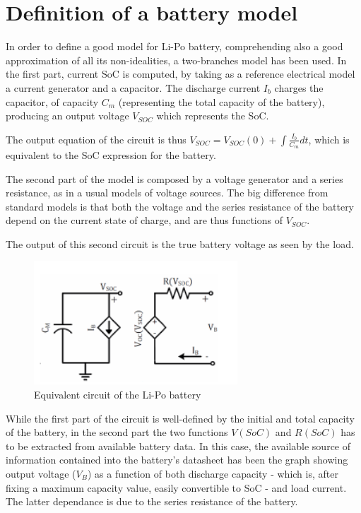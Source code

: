 \section{Definition of a battery model}

In order to define a good model for Li-Po battery, comprehending also a good approximation of all its non-idealities, a two-branches model has been used.
In the first part, current SoC is computed, by taking as a reference electrical model a current generator and a capacitor. The discharge current $I_{b}$ charges the capacitor, of capacity $C_{m}$ (representing the total capacity of the battery), producing an output voltage $V_{SOC}$ which represents the SoC. 


The output equation of the circuit is thus $V_{SOC} = V_{SOC}(0)+\int\!\frac{I_{b}}{C_{m}}dt$, which is equivalent to the SoC expression for the battery.

The second part of the model is composed by a voltage generator and a series resistance, as in a usual models of voltage sources. The big difference from standard models is that both the voltage and the series resistance of the battery depend on the current state of charge, and are thus functions of $V_{SOC}$.

The output of this second circuit is the true battery voltage as seen by the load.

\begin{figure}[h]
  \centering
  \includegraphics[width=3in]{circuit}
  \caption{Equivalent circuit of the Li-Po battery}
\end{figure}

While the first part of the circuit is well-defined by the initial and total capacity of the battery, in the second part the two functions $V(SoC)$ and $R(SoC)$ has to be extracted from available battery data. In this case, the available source of information contained into the battery's datasheet has been the graph showing output voltage ($V_{B}$) as a function of both discharge capacity - which is, after fixing a maximum capacity value, easily convertible to SoC - and load current. The latter dependance is due to the series resistance of the battery.

